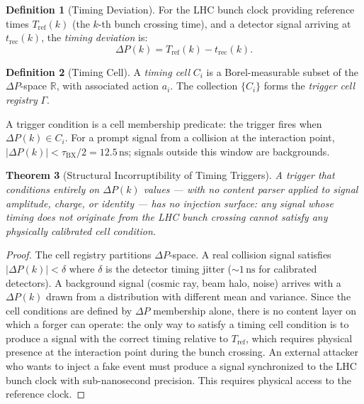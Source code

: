 \documentclass[twocolumn,10pt,a4paper]{article}
\theoremstyle{thmstyle}
\newtheorem{theorem}{Theorem}[section]
\theoremstyle{definition}
\newtheorem{definition}[theorem]{Definition}
\theoremstyle{remark}
\newcommand{\R}{\mathbb{R}}
\newcommand{\dP}{\Delta P}
\begin{document}
\begin{definition}[Timing Deviation]
\label{def:deltaP}
For the LHC bunch clock providing reference times $T_{\mathrm{ref}}(k)$
(the $k$-th bunch crossing time), and a detector signal arriving at
$t_{\mathrm{rec}}(k)$, the \emph{timing deviation} is:
\begin{equation}
\dP(k) = T_{\mathrm{ref}}(k) - t_{\mathrm{rec}}(k).
\label{eq:deltaP}
\end{equation}
\end{definition}

\begin{definition}[Timing Cell]
\label{def:cell}
A \emph{timing cell} $C_i$ is a Borel-measurable subset of the $\dP$-space
$\R$, with associated action $a_i$. The collection $\{C_i\}$ forms the
\emph{trigger cell registry} $\Gamma$.
\end{definition}

A trigger condition is a cell membership predicate: the trigger fires when
$\dP(k) \in C_i$. For a prompt signal from a collision at the interaction
point, $|\dP(k)| < \tau_{\mathrm{BX}}/2 = 12.5\,\mathrm{ns}$; signals
outside this window are backgrounds.

\begin{theorem}[Structural Incorruptibility of Timing Triggers]
\label{thm:incorruptible}
A trigger that conditions entirely on $\dP(k)$ values — with no content
parser applied to signal amplitude, charge, or identity — has no injection
surface: any signal whose timing does not originate from the LHC bunch
crossing cannot satisfy any physically calibrated cell condition.
\end{theorem}

\begin{proof}
The cell registry partitions $\dP$-space. A real collision signal satisfies
$|\dP(k)| < \delta$ where $\delta$ is the detector timing jitter
($\sim 1\,\mathrm{ns}$ for calibrated detectors). A background signal
(cosmic ray, beam halo, noise) arrives with a $\dP(k)$ drawn from a
distribution with different mean and variance. Since the cell conditions are
defined by $\dP$ membership alone, there is no content layer on which a
forger can operate: the only way to satisfy a timing cell condition is to
produce a signal with the correct timing relative to $T_{\mathrm{ref}}$,
which requires physical presence at the interaction point during the bunch
crossing. An external attacker who wants to inject a fake event must produce
a signal synchronized to the LHC bunch clock with sub-nanosecond precision.
This requires physical access to the reference clock.
\end{proof}
\end{document}
